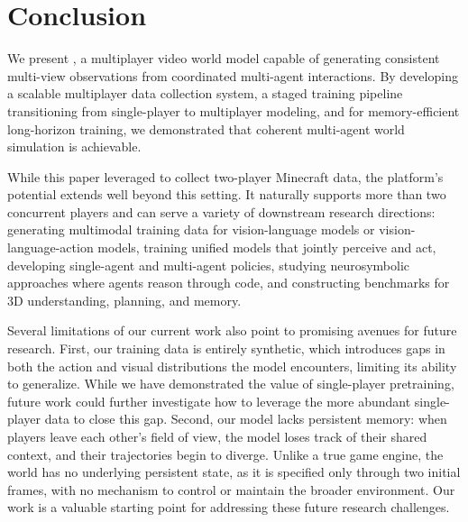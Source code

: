 \section{Conclusion}

We present \solaris, a multiplayer video world model capable of generating consistent multi-view observations from coordinated multi-agent interactions. By developing a scalable multiplayer data collection system, a staged training pipeline transitioning from single-player to multiplayer modeling, and \oursf for memory-efficient long-horizon training, we demonstrated that coherent multi-agent world simulation is achievable.

While this paper leveraged \solarisengine to collect two-player Minecraft data, the platform's potential extends well beyond this setting. It naturally supports more than two concurrent players and can serve a variety of downstream research directions: generating multimodal training data for vision-language models or vision-language-action models, training unified models that jointly perceive and act, developing single-agent and multi-agent policies, studying neurosymbolic approaches where agents reason through code, and constructing benchmarks for 3D understanding, planning, and memory.

Several limitations of our current work also point to promising avenues for future research. First, our training data is entirely synthetic, which introduces gaps in both the action and visual distributions the model encounters, limiting its ability to generalize. While we have demonstrated the value of single-player pretraining, future work could further investigate how to leverage the more abundant single-player data to close this gap. Second, our model lacks persistent memory: when players leave each other's field of view, the model loses track of their shared context, and their trajectories begin to diverge. Unlike a true game engine, the world has no underlying persistent state, as it is specified only through two initial frames, with no mechanism to control or maintain the broader environment. Our work is a valuable starting point for addressing these future research challenges. 

